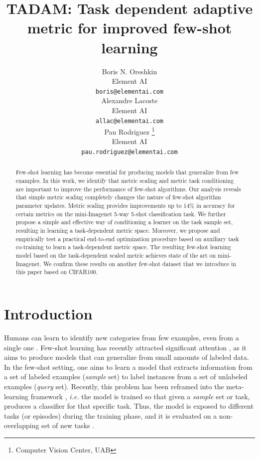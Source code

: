 \documentclass{article}
\title{TADAM: Task dependent adaptive metric for improved few-shot learning}
\author{
    Boris N. Oreshkin \\
    Element AI \\
    \texttt{boris@elementai.com} \\
    \And
    Alexandre Lacoste \\
    Element AI \\
    \texttt{allac@elementai.com} \\
    \And
    Pau Rodriguez
    \thanks{Computer Vision Center, UAB} \\
    Element AI \\
    \texttt{pau.rodriguez@elementai.com}
}
\begin{document}
\maketitle

\begin{abstract}
Few-shot learning has become essential for producing models that generalize from few examples. In this work, we identify that metric scaling and metric task conditioning are important to improve the performance of few-shot algorithms. Our analysis reveals that simple metric scaling completely changes the nature of few-shot algorithm parameter updates. Metric scaling provides improvements up to 14\% in accuracy for certain metrics on the mini-Imagenet 5-way 5-shot classification task. We further propose a simple and effective way of conditioning a learner on the task sample set, resulting in learning a task-dependent metric space. Moreover, we propose and empirically test a practical end-to-end optimization procedure based on auxiliary task co-training to learn a task-dependent metric space. The resulting few-shot learning model based on the task-dependent scaled metric achieves state of the art on mini-Imagenet. We confirm these results on another few-shot dataset that we introduce in this paper based on CIFAR100.
\end{abstract}

\section{Introduction}
Humans can learn to identify new categories from few examples, even from a single one \citep{carey1978acquiring}. Few-shot learning has recently attracted significant attention  \citep{ravi2016optimization,vinyals2016matching, snell2017prototypical,sung2018learning,He2016Deep,Santoro16metalearning,munkhdalai2018rapid,mishra2018simle}, as it aims to produce models that can generalize from small amounts of labeled data. In the few-shot setting, one aims to learn a model that extracts information from a set of labeled examples (\emph{sample} set) to label instances from a set of unlabeled examples (\emph{query} set). Recently, this problem has been reframed into the meta-learning framework \cite{ravi2016optimization}, \emph{i.e.} the model is trained so that given a \emph{sample} set or task, produces a classifier for that specific task. Thus, the model is exposed to different tasks (or episodes) during the training phase, and it is evaluated on a non-overlapping set of new tasks \citep{vinyals2016matching}.
\end{document}
